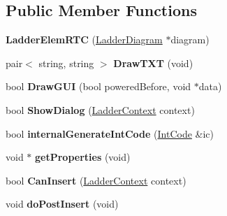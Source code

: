 \subsection*{Public Member Functions}
\begin{DoxyCompactItemize}
\item 
\hypertarget{class_ladder_elem_r_t_c_aa2241d9e92cf019978230d3562c7bf59}{{\bfseries Ladder\-Elem\-R\-T\-C} (\hyperlink{class_ladder_diagram}{Ladder\-Diagram} $\ast$diagram)}\label{class_ladder_elem_r_t_c_aa2241d9e92cf019978230d3562c7bf59}

\item 
\hypertarget{class_ladder_elem_r_t_c_a174dd1bbf4ae1a9054ea2ca5b79221ab}{pair$<$ string, string $>$ {\bfseries Draw\-T\-X\-T} (void)}\label{class_ladder_elem_r_t_c_a174dd1bbf4ae1a9054ea2ca5b79221ab}

\item 
\hypertarget{class_ladder_elem_r_t_c_a5cedf46d6d46899a56e274ded7b70960}{bool {\bfseries Draw\-G\-U\-I} (bool powered\-Before, void $\ast$data)}\label{class_ladder_elem_r_t_c_a5cedf46d6d46899a56e274ded7b70960}

\item 
\hypertarget{class_ladder_elem_r_t_c_a258bcbe40eac5745b5db074d0db60e81}{bool {\bfseries Show\-Dialog} (\hyperlink{struct_ladder_context}{Ladder\-Context} context)}\label{class_ladder_elem_r_t_c_a258bcbe40eac5745b5db074d0db60e81}

\item 
\hypertarget{class_ladder_elem_r_t_c_ad455022d01e9aa861c88e6fa6ccef4d0}{bool {\bfseries internal\-Generate\-Int\-Code} (\hyperlink{class_int_code}{Int\-Code} \&ic)}\label{class_ladder_elem_r_t_c_ad455022d01e9aa861c88e6fa6ccef4d0}

\item 
\hypertarget{class_ladder_elem_r_t_c_a1f547797ab7a0319f43d84657007f402}{void $\ast$ {\bfseries get\-Properties} (void)}\label{class_ladder_elem_r_t_c_a1f547797ab7a0319f43d84657007f402}

\item 
\hypertarget{class_ladder_elem_r_t_c_aa7bdcbbb9da5a8de9017b73efb522066}{bool {\bfseries Can\-Insert} (\hyperlink{struct_ladder_context}{Ladder\-Context} context)}\label{class_ladder_elem_r_t_c_aa7bdcbbb9da5a8de9017b73efb522066}

\item 
\hypertarget{class_ladder_elem_r_t_c_ac32477f5b6782bd58076464ecc6dda1f}{void {\bfseries do\-Post\-Insert} (void)}\label{class_ladder_elem_r_t_c_ac32477f5b6782bd58076464ecc6dda1f}


\end{DoxyCompactItemize}
